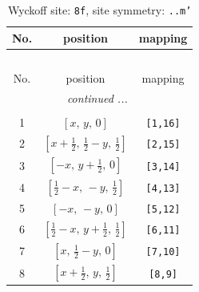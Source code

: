 \documentclass[fleqn,8pt]{jsarticle}
\begin{document}
\begin{longtable}{ccc}
\caption{Wyckoff site: {\tt 8f}, site symmetry: {\tt ..m'}}
 \\
 \hline \hline
No. & position & mapping \\ \hline \endfirsthead

\multicolumn{2}{l}{\tablename\ \thetable{}} \\
 \hline \hline
No. & position & mapping \\ \hline \endhead

 \hline \hline
\multicolumn{2}{r}{\footnotesize\it continued ...} \\ \endfoot

 \hline \hline
\multicolumn{2}{r}{} \\ \endlastfoot

1 & $\left[ x,\, y,\, 0 \right]$ & {\tt [1,16]} \\ \hline
2 & $\left[ x + \frac{1}{2},\, \frac{1}{2} - y,\, \frac{1}{2} \right]$ & {\tt [2,15]} \\ \hline
3 & $\left[ - x,\, y + \frac{1}{2},\, 0 \right]$ & {\tt [3,14]} \\ \hline
4 & $\left[ \frac{1}{2} - x,\, - y,\, \frac{1}{2} \right]$ & {\tt [4,13]} \\ \hline
5 & $\left[ - x,\, - y,\, 0 \right]$ & {\tt [5,12]} \\ \hline
6 & $\left[ \frac{1}{2} - x,\, y + \frac{1}{2},\, \frac{1}{2} \right]$ & {\tt [6,11]} \\ \hline
7 & $\left[ x,\, \frac{1}{2} - y,\, 0 \right]$ & {\tt [7,10]} \\ \hline
8 & $\left[ x + \frac{1}{2},\, y,\, \frac{1}{2} \right]$ & {\tt [8,9]} \\
\end{longtable}
\renewcommand{\arraystretch}{1.2}
\end{document}

